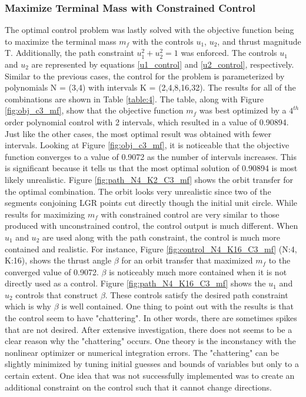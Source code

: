 \documentclass[]{article}
\begin{document}
	\subsubsection{Maximize Terminal Mass with Constrained Control}
	The optimal control problem was lastly solved with the objective function being to maximize the terminal mass \(m_f\) with the controls \(u_1\), \(u_2\), and thrust magnitude T. Additionally, the path constraint \(u_1^2 + u_2^2 = 1\) was enforced. The controls \(u_1\) and \(u_2\) are represented by equations \ref{u1_control} and \ref{u2_control}, respectively. Similar to the previous cases, the control for the problem is parameterized by polynomials N = (3,4) with intervals K = (2,4,8,16,32). The results for all of the combinations are shown in Table \ref{table:4}. The table, along with Figure \ref{fig:obj_c3_mf}, show that the objective function \(m_f\) was best optimized by a \(4^{th}\) order polynomial control with 2 intervals, which resulted in a value of 0.90894. Just like the other cases, the most optimal result was obtained with fewer intervals. Looking at Figure \ref{fig:obj_c3_mf}, it is noticeable that the objective function converges to a value of 0.9072 as the number of intervals increases. This is significant because it tells us that the most optimal solution of 0.90894 is most likely unrealistic. Figure \ref{fig:path_N4_K2_C3_mf} shows the orbit transfer for the optimal combination. The orbit looks very unrealistic since two of the segments conjoining LGR points cut directly though the initial unit circle. While results for maximizing \(m_f\) with constrained control are very similar to those produced with unconstrained control, the control output is much different. When \(u_1\) and \(u_2\) are used along with the path constraint, the control is much more contained and realistic. For instance, Figure \ref{fig:control_N4_K16_C3_mf} (N:4, K:16), shows the thrust angle \(\beta\) for an orbit transfer that maximized \(m_f\) to the converged value of 0.9072. \(\beta\) is noticeably much more contained when it is not directly used as a control. Figure \ref{fig:path_N4_K16_C3_mf} shows the \(u_1\) and \(u_2\) controls that construct \(\beta\). These controls satisfy the desired path constraint which is why \(\beta\) is well contained. One thing to point out with the results is that the control seem to have "chattering". In other words, there are sometimes spikes that are not desired. After extensive investigation, there does not seems to be a clear reason why the "chattering" occurs. One theory is the inconstancy with the nonlinear optimizer or numerical integration errors. The "chattering" can be slightly minimized by tuning initial guesses and bounds of variables but only to a certain extent. One idea that was not successfully implemented was to create an additional constraint on the control such that it cannot change directions.
\end{document}
